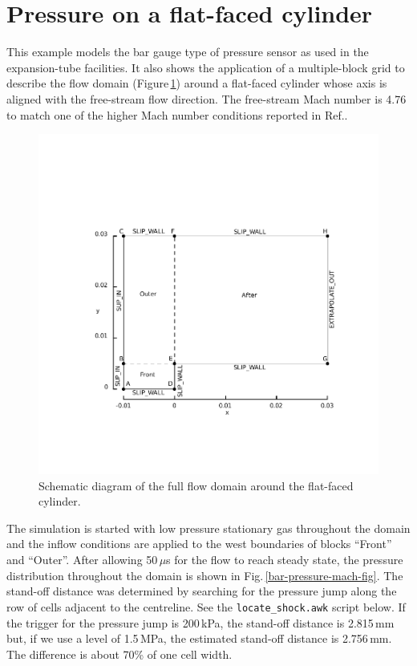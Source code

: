
\section{Pressure on a flat-faced cylinder}
\label{bar-476-sec}
%
This example models the bar gauge type of pressure sensor 
as used in the expansion-tube facilities.
It also shows the application of a multiple-block grid to
describe the flow domain (Figure\,\ref{bar-geometry-fig}) around a flat-faced
cylinder whose axis is aligned with the free-stream flow direction.
The free-stream Mach number is 4.76 to match one of the higher Mach number
conditions reported in Ref.\cite{kendall_1959a}.

\begin{figure}[htbp]
\begin{center}
\includegraphics[width=12cm,viewport=75 78 397 328,clip=true]{../2D/bar-476/bar-layout.pdf}
\end{center}
\caption{Schematic diagram of the full flow domain around the flat-faced cylinder.}
\label{bar-geometry-fig}
\end{figure}

The simulation is started with low pressure stationary gas throughout
the domain and the inflow conditions are applied to the west boundaries
of blocks ``Front'' and ``Outer''.
After allowing 50\,$\mu$s for the flow to reach steady state, 
the pressure distribution throughout the domain is shown in
Fig.\,\ref{bar-pressure-mach-fig}.
The stand-off distance was determined by searching
for the pressure jump along the row of cells adjacent to the centreline.
See the \texttt{locate\_shock.awk} script below.
If the trigger for the pressure jump is 200\,kPa, the stand-off distance is 2.815\,mm but, 
if we use a level of 1.5\,MPa, the estimated stand-off distance is 2.756\,mm.
The difference is about 70\% of one cell width. 

